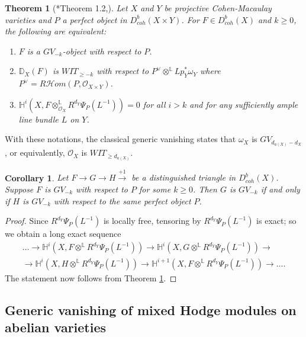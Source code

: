 \documentclass[11pt]{amsart}
\newtheorem{theorem}[equation]{Theorem}
\newtheorem{corollary}[equation]{Corollary}
\theoremstyle{definition}
\theoremstyle{plain}
\renewcommand{\H}{\mathcal H}
\renewcommand{\O}{\mathcal O}
\newcommand{\HH}{\mathbb H}
\newcommand{\LL}{\mathbb L}
\newcommand{\DD}{\mathbb D}
\newcommand{\xto}{\xrightarrow} %
\newcommand{\sHom}{\H om} %
\begin{document}
\begin{theorem}[{\cite{Hacon-gen_vanishing}*{Theorem 1.2}},{\cite[Theorem 3.7]{PP_Generic_Vanishing}}] \label{theorem: GV and WIT equiv}
    Let $X$ and $Y$ be projective Cohen-Macaulay varieties and $P$ a perfect object in $D_{coh}^b(X\times Y)$. For $F\in D_{coh}^b(X)$ and $k\ge 0$, the following are equivalent:
    \begin{enumerate}
        \item $F$ is a $GV_{-k}$-object with respect to $P$. 
        \item $\DD_X(F)$ is $WIT_{\ge -k}$ with respect to $P^\vee \otimes^{\LL} Lp_Y^* \omega_Y$ where $P^\vee = R\sHom(P,\O_{X\times Y})$. 
        \item $\HH^i(X, F\otimes^{\LL}_{\O_X} R^{d_Y}\Psi_P(L^{-1}))=0$ for all $i>k$ and for any sufficiently ample line bundle $L$ on $Y$. 
    \end{enumerate} 
\end{theorem}

With these notations, the classical generic vanishing states that $\omega_X$ is $GV_{d_{a(X)}-d_X}$, or equivalently, $\O_X$ is $WIT_{\ge d_{a(X)}}$. 

\begin{corollary} \label{corollary: GV exact sequence}
    Let $F\to G\to H\xto{+1}$ be a distinguished triangle in $D_{coh}^b(X)$. Suppose $F$ is $GV_{-k}$ with respect to $P$ for some $k\ge 0$. Then $G$ is $GV_{-k}$ if and only if $H$ is $GV_{-k}$ with respect to the same perfect object $P$. 
\end{corollary}

\begin{proof}
    Since $R^{d_Y}\Psi_P(L^{-1})$ is locally free, tensoring by $R^{d_Y}\Psi_P(L^{-1})$ is exact; so we obtain a long exact sequence 
    \begin{multline*}
    \dots \to \HH^i(X, F \otimes^{\LL} R^{d_Y}\Psi_P(L^{-1})) \to \HH^i(X, G \otimes^{\LL} R^{d_Y}\Psi_P(L^{-1})) \to \\
    \to\HH^i(X, H \otimes^{\LL} R^{d_Y}\Psi_P(L^{-1})) \to 
    \HH^{i+1}(X, F \otimes^{\LL} R^{d_Y}\Psi_P(L^{-1}))\to \dots.
    \end{multline*}
    The statement now follows from Theorem \ref{theorem: GV and WIT equiv}. 
\end{proof}




\subsection{Generic vanishing of mixed Hodge modules on abelian varieties}
\end{document}
